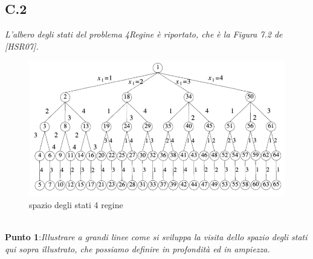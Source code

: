 \documentclass[a4paper]{article}
\begin{document}
\subsection{C.2}
\emph{L'albero degli stati del problema 4Regine è riportato, che è la Figura 7.2 de [HSR07].}\\
\begin{figure}[!ht]
\centering
\includegraphics[width=1\textwidth]{./img/C_2.png}
\caption{spazio degli stati 4 regine} \label{FIG:C_2}
\end{figure}\\
\textbf{Punto 1}:\emph{Illustrare a grandi linee come si sviluppa la visita dello spazio degli stati qui sopra illustrato, che possiamo definire in profondità ed in ampiezza.}
\end{document}
